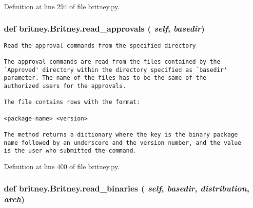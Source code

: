 Definition at line 294 of file britney.py.
\subsubsection{\setlength{\rightskip}{0pt plus 5cm}def britney.Britney.read\_\-approvals ( {\em self},  {\em basedir})}\label{classbritney_1_1Britney_39248f0cfea1c8798b2ca5a97d37eaf8}




\footnotesize\begin{verbatim}Read the approval commands from the specified directory

The approval commands are read from the files contained by the 
`Approved' directory within the directory specified as `basedir'
parameter. The name of the files has to be the same of the
authorized users for the approvals.

The file contains rows with the format:

<package-name> <version>

The method returns a dictionary where the key is the binary package
name followed by an underscore and the version number, and the value
is the user who submitted the command.
\end{verbatim}
\normalsize
 

Definition at line 400 of file britney.py.
\subsubsection{\setlength{\rightskip}{0pt plus 5cm}def britney.Britney.read\_\-binaries ( {\em self},  {\em basedir},  {\em distribution},  {\em arch})}\label{classbritney_1_1Britney_1b2b0f42e4af1cee472f93e955b30421}





